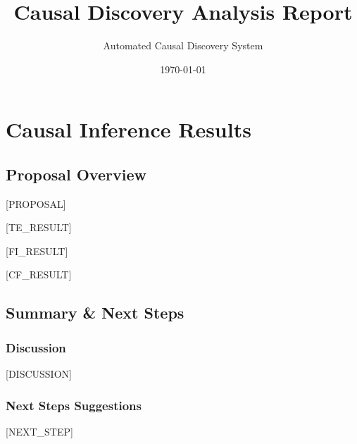 \documentclass[10pt]{article}
\title{Causal Discovery Analysis Report}
\author{Automated Causal Discovery System}
\date{\today}
\begin{document}
\maketitle

\section{Causal Inference Results}
\subsection{Proposal Overview}
[PROPOSAL]

[TE_RESULT]

[FI_RESULT]

[CF_RESULT]

\subsection{Summary \& Next Steps}
\subsubsection{Discussion}

[DISCUSSION]


\subsubsection{Next Steps Suggestions}

[NEXT_STEP]
\end{document}
